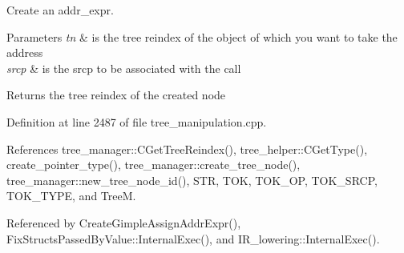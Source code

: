 Create an addr\+\_\+expr. 


\begin{DoxyParams}{Parameters}
{\em tn} & is the tree reindex of the object of which you want to take the address \\
\hline
{\em srcp} & is the srcp to be associated with the call \\
\hline
\end{DoxyParams}
\begin{DoxyReturn}{Returns}
the tree reindex of the created node 
\end{DoxyReturn}


Definition at line 2487 of file tree\+\_\+manipulation.\+cpp.



References tree\+\_\+manager\+::\+C\+Get\+Tree\+Reindex(), tree\+\_\+helper\+::\+C\+Get\+Type(), create\+\_\+pointer\+\_\+type(), tree\+\_\+manager\+::create\+\_\+tree\+\_\+node(), tree\+\_\+manager\+::new\+\_\+tree\+\_\+node\+\_\+id(), S\+TR, T\+OK, T\+O\+K\+\_\+\+OP, T\+O\+K\+\_\+\+S\+R\+CP, T\+O\+K\+\_\+\+T\+Y\+PE, and TreeM.



Referenced by Create\+Gimple\+Assign\+Addr\+Expr(), Fix\+Structs\+Passed\+By\+Value\+::\+Internal\+Exec(), and I\+R\+\_\+lowering\+::\+Internal\+Exec().

